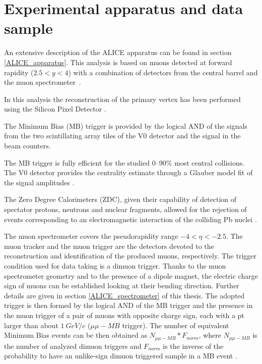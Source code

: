 \section{Experimental apparatus and data sample}

An extensive description of the ALICE apparatus can be found in section \ref{ALICE_apparatus}.
This analysis is based on muons detected at forward rapidity ($2.5<y<4$) with a combination of detectors from the central barrel and the muon spectrometer~\cite{Aamodt:2011gj}. 

In this analysis the reconstruction of the primary vertex has been performed using the Silicon Pixel Detector \cite{Aamodt:2010aa}.

The Minimum Bias (MB) trigger is provided by the logical AND of the signals from the two scintillating array tiles of the V0 detector \cite{Abbas:2013taa} and the signal in the beam counters.

The MB trigger is fully efficient for the studied 0--90\% most central collisions.
The V0 detector provides the centrality estimate through a Glauber model fit of the signal amplitudes \cite{Abelev:2013qoq,Adam:2015ptt}.

The Zero Degree Calorimeters (ZDC), given their capability of detection of spectator protons, neutrons and nuclear fragments, allowed for the rejection of events corresponding to an electromagnetic interaction of the colliding Pb nuclei \cite{ALICE:2012aa}.

The muon spectrometer covers the pseudorapidity range $-4<\eta<-2.5$.
The muon tracker and the muon trigger are the detectors devoted to the reconstruction and identification of the produced muons, respectively.
The trigger condition used for data taking is a dimuon trigger.
Thanks to the muon spectrometer geometry and to the presence of a dipole magnet, the electric charge sign of muons can be established looking at their bending direction.
Further details are given in section \ref{ALICE_spectrometer} of this thesis.
The adopted trigger is then formed by the logical AND of the MB trigger and the presence in the muon trigger of a pair of muons with opposite charge sign, each with a pt larger than about $1\ GeV/c$ ($\mu \mu-MB$ trigger). 
The number of equivalent Minimum Bias events can be then obtained as $N_{\mu \mu-MB} * F_{norm}$, where $N_{\mu \mu-MB}$ is the number of analyzed dimuon triggers and $F_{norm}$ is the inverse of the probability to have an unlike-sign dimuon triggered sample in a MB event \cite{Adam:2016rdg}.

